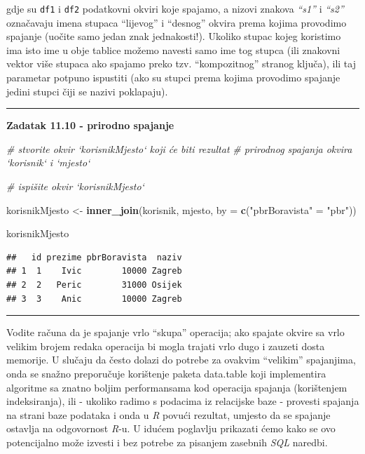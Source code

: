 \documentclass[]{book}
\newenvironment{Shaded}{\begin{snugshade}}{\end{snugshade}}
\newcommand{\KeywordTok}[1]{\textcolor[rgb]{0.13,0.29,0.53}{\textbf{#1}}}
\newcommand{\DataTypeTok}[1]{\textcolor[rgb]{0.13,0.29,0.53}{#1}}
\newcommand{\StringTok}[1]{\textcolor[rgb]{0.31,0.60,0.02}{#1}}
\newcommand{\CommentTok}[1]{\textcolor[rgb]{0.56,0.35,0.01}{\textit{#1}}}
\newcommand{\NormalTok}[1]{#1}
\theoremstyle{definition}
\theoremstyle{definition}
\theoremstyle{definition}
\theoremstyle{remark}
\begin{document}
gdje su \texttt{df1} i \texttt{df2} podatkovni okviri koje spajamo, a
nizovi znakova \emph{``s1''} i \emph{``s2''} označavaju imena stupaca
``lijevog'' i ``desnog'' okvira prema kojima provodimo spajanje (uočite
samo jedan znak jednakosti!). Ukoliko stupac kojeg koristimo ima isto
ime u obje tablice možemo navesti samo ime tog stupca (ili znakovni
vektor više stupaca ako spajamo preko tzv. ``kompozitnog'' stranog
ključa), ili taj parametar potpuno ispustiti (ako su stupci prema kojima
provodimo spajanje jedini stupci čiji se nazivi poklapaju).

\begin{center}\rule{0.5\linewidth}{\linethickness}\end{center}

\textbf{Zadatak 11.10 - prirodno spajanje}

\begin{Shaded}
\begin{Highlighting}[]
\CommentTok{# stvorite okvir `korisnikMjesto` koji će biti rezultat}
\CommentTok{# prirodnog spajanja okvira `korisnik` i `mjesto`}


\CommentTok{# ispišite okvir `korisnikMjesto`}
\end{Highlighting}
\end{Shaded}

\begin{Shaded}
\begin{Highlighting}[]
\NormalTok{korisnikMjesto <-}\StringTok{ }\KeywordTok{inner_join}\NormalTok{(korisnik, mjesto, }\DataTypeTok{by =} \KeywordTok{c}\NormalTok{(}\StringTok{"pbrBoravista"}\NormalTok{ =}\StringTok{ "pbr"}\NormalTok{))}


\NormalTok{korisnikMjesto}
\end{Highlighting}
\end{Shaded}

\begin{verbatim}
##   id prezime pbrBoravista  naziv
## 1  1    Ivic        10000 Zagreb
## 2  2   Peric        31000 Osijek
## 3  3    Anic        10000 Zagreb
\end{verbatim}

\begin{center}\rule{0.5\linewidth}{\linethickness}\end{center}

Vodite računa da je spajanje vrlo ``skupa'' operacija; ako spajate
okvire sa vrlo velikim brojem redaka operacija bi mogla trajati vrlo
dugo i zauzeti dosta memorije. U slučaju da često dolazi do potrebe za
ovakvim ``velikim'' spajanjima, onda se snažno preporučuje korištenje
paketa data.table koji implementira algoritme sa znatno boljim
performansama kod operacija spajanja (korištenjem indeksiranja), ili -
ukoliko radimo s podacima iz relacijske baze - provesti spajanja na
strani baze podataka i onda u \emph{R} povući rezultat, umjesto da se
spajanje ostavlja na odgovornost \emph{R}-u. U idućem poglavlju
prikazati ćemo kako se ovo potencijalno može izvesti i bez potrebe za
pisanjem zasebnih \emph{SQL} naredbi.
\end{document}
